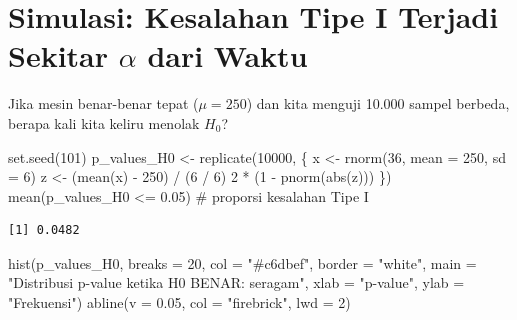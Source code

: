\documentclass[
  indonesian,
  letterpaper,
]{book}
\newenvironment{Shaded}{\begin{snugshade}}{\end{snugshade}}
\newcommand{\AttributeTok}[1]{\textcolor[rgb]{0.40,0.45,0.13}{#1}}
\newcommand{\CommentTok}[1]{\textcolor[rgb]{0.37,0.37,0.37}{#1}}
\newcommand{\DecValTok}[1]{\textcolor[rgb]{0.68,0.00,0.00}{#1}}
\newcommand{\FloatTok}[1]{\textcolor[rgb]{0.68,0.00,0.00}{#1}}
\newcommand{\FunctionTok}[1]{\textcolor[rgb]{0.28,0.35,0.67}{#1}}
\newcommand{\NormalTok}[1]{\textcolor[rgb]{0.00,0.23,0.31}{#1}}
\newcommand{\OtherTok}[1]{\textcolor[rgb]{0.00,0.23,0.31}{#1}}
\newcommand{\SpecialCharTok}[1]{\textcolor[rgb]{0.37,0.37,0.37}{#1}}
\newcommand{\StringTok}[1]{\textcolor[rgb]{0.13,0.47,0.30}{#1}}
\begin{document}
\section{\texorpdfstring{Simulasi: Kesalahan Tipe I Terjadi Sekitar
\(\alpha\) dari
Waktu}{Simulasi: Kesalahan Tipe I Terjadi Sekitar \textbackslash alpha dari Waktu}}\label{simulasi-kesalahan-tipe-i-terjadi-sekitar-alpha-dari-waktu}

Jika mesin benar-benar tepat (\(\mu = 250\)) dan kita menguji 10.000
sampel berbeda, berapa kali kita keliru menolak \(H_0\)?

\begin{Shaded}
\begin{Highlighting}[]
\FunctionTok{set.seed}\NormalTok{(}\DecValTok{101}\NormalTok{)}
\NormalTok{p\_values\_H0 }\OtherTok{\textless{}{-}} \FunctionTok{replicate}\NormalTok{(}\DecValTok{10000}\NormalTok{, \{}
\NormalTok{  x }\OtherTok{\textless{}{-}} \FunctionTok{rnorm}\NormalTok{(}\DecValTok{36}\NormalTok{, }\AttributeTok{mean =} \DecValTok{250}\NormalTok{, }\AttributeTok{sd =} \DecValTok{6}\NormalTok{)}
\NormalTok{  z }\OtherTok{\textless{}{-}}\NormalTok{ (}\FunctionTok{mean}\NormalTok{(x) }\SpecialCharTok{{-}} \DecValTok{250}\NormalTok{) }\SpecialCharTok{/}\NormalTok{ (}\DecValTok{6} \SpecialCharTok{/} \DecValTok{6}\NormalTok{)}
  \DecValTok{2} \SpecialCharTok{*}\NormalTok{ (}\DecValTok{1} \SpecialCharTok{{-}} \FunctionTok{pnorm}\NormalTok{(}\FunctionTok{abs}\NormalTok{(z)))}
\NormalTok{\})}
\FunctionTok{mean}\NormalTok{(p\_values\_H0 }\SpecialCharTok{\textless{}=} \FloatTok{0.05}\NormalTok{)   }\CommentTok{\# proporsi kesalahan Tipe I}
\end{Highlighting}
\end{Shaded}

\begin{verbatim}
[1] 0.0482
\end{verbatim}

\begin{Shaded}
\begin{Highlighting}[]
\FunctionTok{hist}\NormalTok{(p\_values\_H0, }\AttributeTok{breaks =} \DecValTok{20}\NormalTok{, }\AttributeTok{col =} \StringTok{"\#c6dbef"}\NormalTok{, }\AttributeTok{border =} \StringTok{"white"}\NormalTok{,}
     \AttributeTok{main =} \StringTok{"Distribusi p{-}value ketika H0 BENAR: seragam"}\NormalTok{,}
     \AttributeTok{xlab =} \StringTok{"p{-}value"}\NormalTok{, }\AttributeTok{ylab =} \StringTok{"Frekuensi"}\NormalTok{)}
\FunctionTok{abline}\NormalTok{(}\AttributeTok{v =} \FloatTok{0.05}\NormalTok{, }\AttributeTok{col =} \StringTok{"firebrick"}\NormalTok{, }\AttributeTok{lwd =} \DecValTok{2}\NormalTok{)}
\end{Highlighting}
\end{Shaded}
\end{document}
